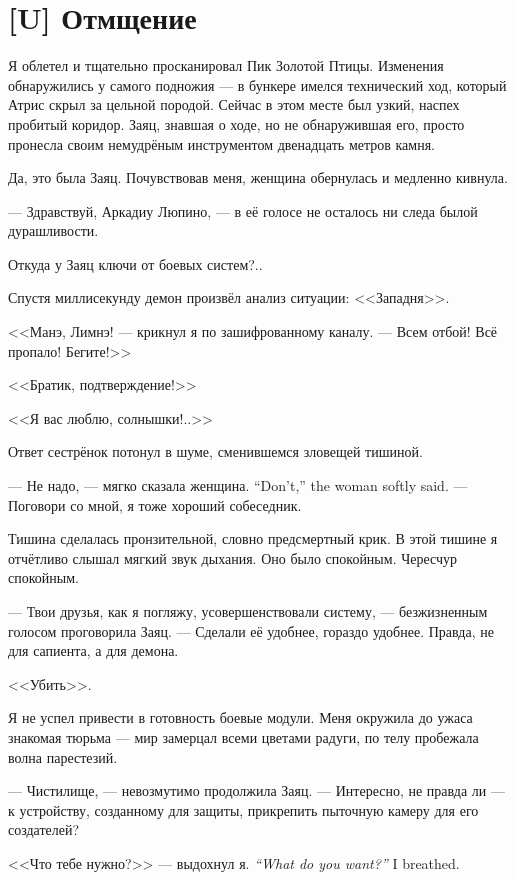 \section{[U] Отмщение}

\textspace

Я облетел и тщательно просканировал Пик Золотой Птицы.
Изменения обнаружились у самого подножия --- в бункере имелся технический ход, который Атрис скрыл за цельной породой.
Сейчас в этом месте был узкий, наспех пробитый коридор.
Заяц, знавшая о ходе, но не обнаружившая его, просто пронесла своим немудрёным инструментом двенадцать метров камня.

\textspace

Да, это была Заяц.
Почувствовав меня, женщина обернулась и медленно кивнула.

--- Здравствуй, Аркадиу Люпино, --- в её голосе не осталось ни следа былой дурашливости.

Откуда у Заяц ключи от боевых систем?..

Спустя миллисекунду демон произвёл анализ ситуации: <<Западня>>.

<<Манэ, Лимнэ! --- крикнул я по зашифрованному каналу.
--- Всем отбой!
Всё пропало!
Бегите!>>

<<Братик, подтверждение!>>

<<Я вас люблю, солнышки!..>>

Ответ сестрёнок потонул в шуме, сменившемся зловещей тишиной.

{--- Не надо, --- мягко сказала женщина.}
{``Don't,'' the woman softly said.}
--- Поговори со мной, я тоже хороший собеседник.

Тишина сделалась пронзительной, словно предсмертный крик.
В этой тишине я отчётливо слышал мягкий звук дыхания.
Оно было спокойным.
Чересчур спокойным.

--- Твои друзья, как я погляжу, усовершенствовали систему, --- безжизненным голосом проговорила Заяц.
--- Сделали её удобнее, гораздо удобнее.
Правда, не для сапиента, а для демона.

<<Убить>>.

Я не успел привести в готовность боевые модули.
Меня окружила до ужаса знакомая тюрьма --- мир замерцал всеми цветами радуги, по телу пробежала волна парестезий.

--- Чистилище, --- невозмутимо продолжила Заяц.
--- Интересно, не правда ли --- к устройству, созданному для защиты, прикрепить пыточную камеру для его создателей?

{<<Что тебе нужно?>> --- выдохнул я.}
{\textit{``What do you want?''} I breathed.}

